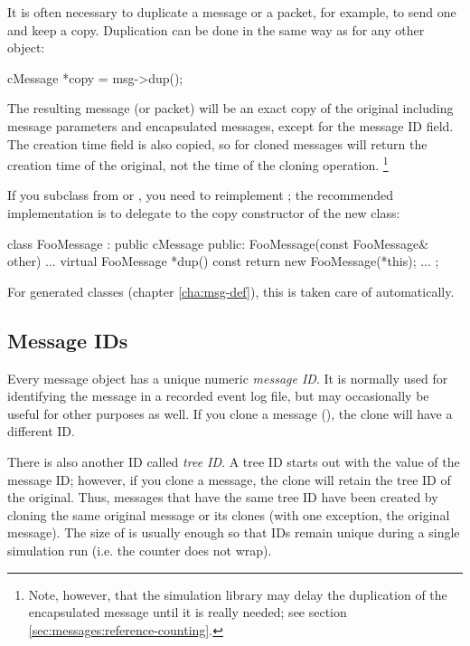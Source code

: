 It is often necessary to duplicate a message or a packet, for example,
to send one and keep a copy. Duplication can be done in the same way as
for any other {\opp} object:

\begin{cpp}
cMessage *copy = msg->dup();
\end{cpp}

The resulting message (or packet) will be an exact copy of the original
including message parameters and encapsulated messages, except for the
message ID field. The creation time field is also copied, so
for cloned messages  will return the creation
time of the original, not the time of the cloning operation.
  \footnote{Note, however, that the simulation library may delay the
  duplication of the encapsulated message until it is really needed;
  see section \ref{sec:messages:reference-counting}.}

If you subclass from  or , you need
to reimplement ; the recommended implementation is to delegate
to the copy constructor of the new class:

\begin{cpp}
class FooMessage : public cMessage {
  public:
    FooMessage(const FooMessage& other) {...}
    virtual FooMessage *dup() const {return new FooMessage(*this);}
    ...
};
\end{cpp}

For generated classes (chapter \ref{cha:msg-def}), this is
taken care of automatically.


\subsection{Message IDs}
\label{sec:messages:message-ids}

Every message object has a unique numeric \textit{message ID}. It is normally
used for identifying the message in a recorded event log file, but may occasionally
be useful for other purposes as well. If you clone a message (),
the clone will have a different ID.

There is also another ID called \textit{tree ID}. A tree ID starts out with
the value of the message ID; however, if you clone a message, the clone
will retain the tree ID of the original. Thus, messages that have the same
tree ID have been created by cloning the same original message or its
clones (with one exception, the original message).  The size of 
is usually enough so that IDs remain unique during a single simulation run
(i.e. the counter does not wrap).

